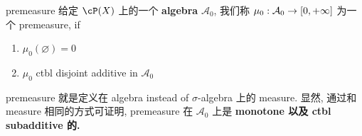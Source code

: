 \documentclass[lang=cn,11pt]{elegantbook}
\begin{document}
\begin{definition}{premeasure}
给定 $\cP(X)$ 上的一个 \textbf{algebra} $\mathcal{A}_0$, 我们称 \(\mu_0: \mathcal{A}_0 \rightarrow [0,+\infty]\)  为一个 premeasure, if
\begin{enumerate}
    \item \(\mu_0(\varnothing)  = 0\)
    \item \(\mu_0\) ctbl disjoint additive in $\mathcal{A}_0$
\end{enumerate}
\end{definition}

\begin{remark}
premeasure 就是定义在 algebra instead of $\sigma$-algebra 上的 measure. 显然, 通过和 measure 相同的方式可证明, premeasure 在 $\mathcal{A}_0$ 上是 \textbf{monotone 以及 ctbl subadditive 的.  }  
\end{remark}
\end{document}
